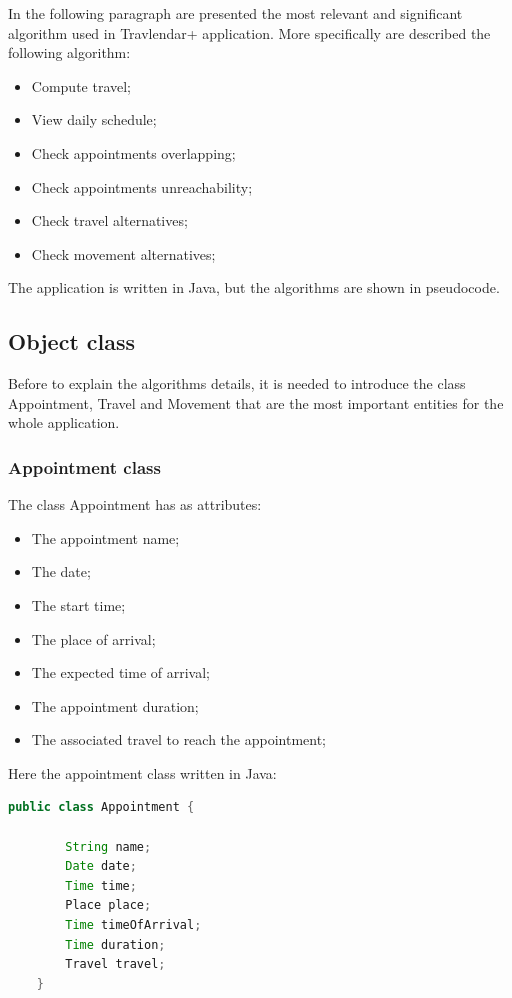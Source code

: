 In the following paragraph are presented the most relevant and significant algorithm used in Travlendar+ application.
More specifically are described the following algorithm:
\begin{itemize}
	\item Compute travel;
	\item View daily schedule;
	\item Check appointments overlapping;
	\item Check appointments unreachability;
	\item Check travel alternatives;
	\item Check movement alternatives;
\end{itemize}

The application is written in Java, but the algorithms are shown in pseudocode.

\subsection{Object class}

Before to explain the algorithms details, it is needed to introduce the class Appointment, Travel and Movement that are the most important entities for the whole application.

\subsubsection{Appointment class}

The class Appointment has as attributes:
\begin{itemize}
	\item The appointment name;
	\item The date;
	\item The start time;
	\item The place of arrival;
	\item The expected time of arrival;
	\item The appointment duration;
	\item The associated travel to reach the appointment;
\end{itemize}

Here the appointment class written in Java:
\begin{lstlisting}[language=Java]
	public class Appointment {
	
		String name;
		Date date;
		Time time;
		Place place;
		Time timeOfArrival;
		Time duration;
		Travel travel;
	}
		
\end{lstlisting}

